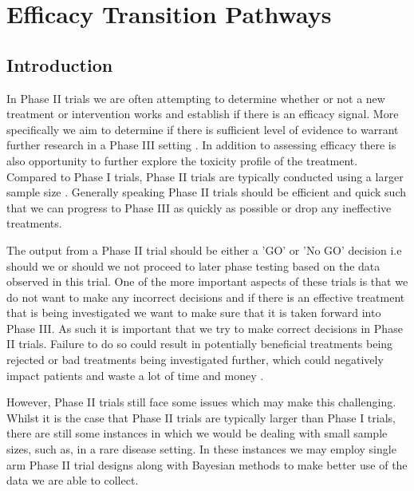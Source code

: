 
\chapter{Efficacy Transition Pathways} %

\label{etp} %


\section{Introduction}
\label{etp:Introduction}

In Phase \RN{2} trials we are often attempting to determine whether or not a new treatment or intervention works and establish if there is an efficacy signal. More specifically we aim to determine if there is sufficient level of evidence to warrant further research in a Phase \RN{3} setting \cite{jungRandomizedPhaseII2014}. In addition to assessing efficacy there is also opportunity to further explore the toxicity profile of the treatment. Compared to Phase \RN{1} trials, Phase \RN{2} trials are typically conducted using a larger sample size \cite{evansFundamentalsClinicalTrial2010}. Generally speaking Phase \RN{2} trials should be efficient and quick such that we can progress to Phase \RN{3} as quickly as possible or drop any ineffective treatments.

The output from a Phase \RN{2} trial should be either a 'GO' or 'No GO' decision i.e should we or should we not proceed to later phase testing based on the data observed in this trial. One of the more important aspects of these trials is that we do not want to make any incorrect decisions and if there is an effective treatment that is being investigated we want to make sure that it is taken forward into Phase \RN{3}. As such it is important that we try to make correct decisions in Phase \RN{2} trials. Failure to do so could result in potentially beneficial treatments being rejected or bad treatments being investigated further, which could negatively impact patients and waste a lot of time and money \cite{vanPhaseIITrials2019}. 

However, Phase \RN{2} trials still face some issues which may make this challenging. Whilst it is the case that Phase \RN{2} trials are typically larger than Phase \RN{1} trials, there are still some instances in which we would be dealing with small sample sizes, such as, in a rare disease setting. In these instances we may employ single arm Phase \RN{2} trial designs along with Bayesian methods to make better use of the data we are able to collect. 

